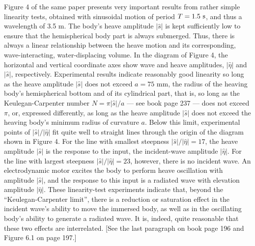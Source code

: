 \documentclass[a4paper,12pt]{article}
\begin{document}
Figure 4 of the same paper presents very important results from rather simple linearity tests, obtained with sinusoidal motion of period $T = 1.5 \ \rm s$, and thus a wavelength of 3.5 m. The body's heave amplitude $|{\hat s}|$ is kept sufficiently low to ensure that the hemispherical body part is always submerged. Thus, there is always a linear relationship between the heave motion and its corresponding, wave-interacting, water-displacing volume. In the diagram of Figure 4, the horizontal and vertical coordinate axes show wave and heave amplitudes, $|{\hat \eta}|$ and ${|\hat s}|$, respectively. Experimental results indicate reasonably good linearity so long as the heave amplitude $|{\hat s}|$ does not exceed $a =75 $ mm, the radius of the heaving body's hemispherical bottom and of its cylindrical part, that is, so long as the Keulegan-Carpenter number $N = \pi |{\hat s}| / a $  --- see book page 237 --- does not exceed $\pi$, or, expressed differently, as long as the heave amplitude ${|\hat s}|$ does not exceed the heaving body's minimum radius of curvature $a$. Below this limit, experimental points of $|{\hat s}|/|{\hat \eta}|$ fit quite well to straight lines through the origin of the diagram shown in Figure 4. For the line with smallest steepness $|{\hat s}|/|{\hat \eta}| = 17$, the heave amplitude $|{\hat s}|$ is the response to the input, the incident-wave amplitude $|{\hat \eta}|$.
%
For the line with largest steepness $|{\hat s}|/|{\hat \eta}| = 23$, however, there is no incident wave. An electrodynamic motor excites the body to perform heave oscillation with amplitude $|{\hat s}|$, and the response to this input is a radiated wave with elevation amplitude $|{\hat \eta}|$.
These linearity-test experiments indicate that, beyond the ``Keulegan-Carpenter limit'', there is a reduction or saturation effect in the incident wave's ability to move the immersed body, as well as in the oscillating body's ability to generate a radiated wave. It is, indeed, quite reasonable that these two effects are interrelated. [See the last paragraph on book page 196 and Figure 6.1 on page 197.] 
\newline  {$\diamondsuit$}  \vspace{0.15cm} %
\end{document}
